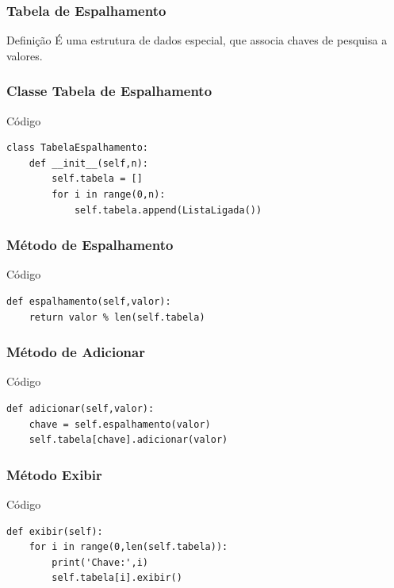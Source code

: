 \documentclass{beamer}
\begin{document}
\begin{frame}
\frametitle{Tabela de Espalhamento}

\begin{block}{Definição}
É uma estrutura de dados especial, que associa chaves de pesquisa a valores.
\end{block}
\end{frame}

\begin{frame}[fragile]
\frametitle{Classe Tabela de Espalhamento}

\begin{exampleblock}{Código}
	\begin{lstlisting}
class TabelaEspalhamento:
    def __init__(self,n):
        self.tabela = []
        for i in range(0,n):
            self.tabela.append(ListaLigada())
	\end{lstlisting}
\end{exampleblock}
\end{frame}

\begin{frame}[fragile]
\frametitle{Método de Espalhamento}

\begin{exampleblock}{Código}
	\begin{lstlisting}
def espalhamento(self,valor):
    return valor % len(self.tabela)
	\end{lstlisting}
\end{exampleblock}
\end{frame}

\begin{frame}[fragile]
\frametitle{Método de Adicionar}

\begin{exampleblock}{Código}
	\begin{lstlisting}
def adicionar(self,valor):
    chave = self.espalhamento(valor)
    self.tabela[chave].adicionar(valor)
	\end{lstlisting}
\end{exampleblock}
\end{frame}

\begin{frame}[fragile]
\frametitle{Método Exibir}

\begin{exampleblock}{Código}
	\begin{lstlisting}
def exibir(self):
    for i in range(0,len(self.tabela)):
        print('Chave:',i)
        self.tabela[i].exibir()
	\end{lstlisting}
\end{exampleblock}
\end{frame}
\end{document}
